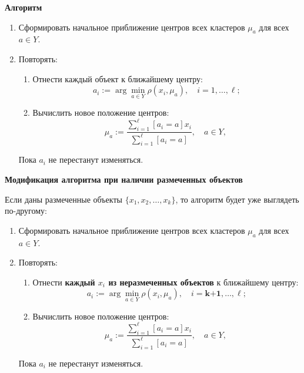 \textbf{Алгоритм}
\begin{enumerate}
    \item Сформировать начальное приближение центров всех кластеров  $\mu_a$ для всех ${a \in Y}$.
    \item Повторять:
          \begin{enumerate}
              \item Отнести каждый объект к ближайшему центру:
                    \[
                        a_i := \arg \min_{a \in Y} \rho(x_i, \mu_a), \quad i = 1, \ldots, \ell;
                    \]
              \item Вычислить новое положение центров:
                    \[
                        \mu_{a} := \frac{\sum_{i=1}^\ell [a_i = a] x_i}{\sum_{i=1}^\ell [a_i = a]}, 
                        \quad a \in Y, \; 
                    \]
          \end{enumerate}
          Пока $a_i$ не перестанут изменяться.
\end{enumerate}

\textbf{Модификация алгоритма
    при наличии размеченных объектов}

Если даны размеченные объекты $\{x_1, x_2, \ldots, x_k\}$, то алгоритм будет уже выглядеть по-другому:

\begin{enumerate}
    \item Сформировать начальное приближение центров всех кластеров  $\mu_a$ для всех ${a \in Y}$.
    \item Повторять:
          \begin{enumerate}
              \item Отнести \textbf{каждый $x_{i}$ из неразмеченных объектов} к ближайшему центру:
                    \[
                        a_i := \arg \min_{a \in Y} \rho(x_i, \mu_a), \quad i = \textbf{k+1}, \ldots, \ell;
                    \]
              \item Вычислить новое положение центров:
                    \[
                        \mu_{a} := \frac{\sum_{i=1}^\ell [a_i = a] x_i}{\sum_{i=1}^\ell [a_i = a]}, 
                        \quad a \in Y, \; 
                    \]
          \end{enumerate}
          Пока $a_i$ не перестанут изменяться.
\end{enumerate}

